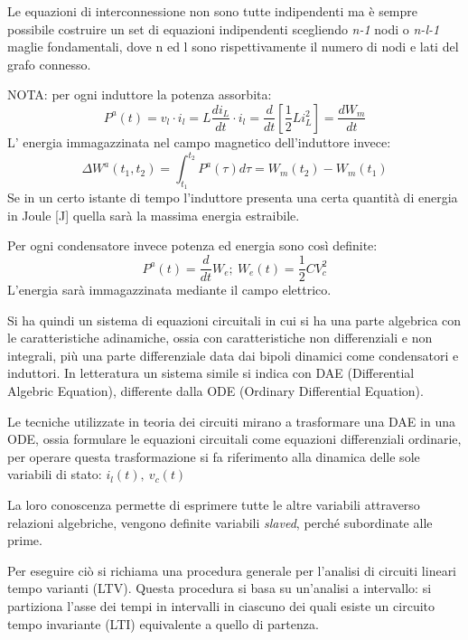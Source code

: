 Le equazioni di interconnessione non sono tutte indipendenti ma è sempre possibile
costruire un set di equazioni indipendenti scegliendo \textit{n-1} nodi o \textit{n-l-1} maglie fondamentali,
dove n ed l sono rispettivamente il numero di nodi e lati del grafo connesso.

NOTA: per ogni induttore la potenza assorbita:
$$ P^a(t) = v_l\cdot i_l = L \frac{di_L}{dt}\cdot i_l = \frac{d}{dt} \left[\frac{1}{2}Li_L^2\right] = \frac{dW_m}{dt} $$ 
L' energia immagazzinata nel campo magnetico dell'induttore invece:
$$\Delta W^a(t_1,t_2) = \int_{t_1}^{t_2} P^a(\tau)d\tau = W_m (t_2) - W_m(t_1) $$
Se in un certo istante di tempo l'induttore presenta una certa quantità di energia in Joule [\si{\joule}] quella sarà la massima energia estraibile.

Per ogni condensatore invece potenza ed energia sono così definite:
$$P^a(t) = \frac{d}{dt} W_e;\ W_e(t) = \frac{1}{2} CV_c^2$$
L'energia sarà immagazzinata mediante il campo elettrico.

Si ha quindi un sistema di equazioni circuitali in cui si ha una parte algebrica con le caratteristiche adinamiche, ossia con caratteristiche
non differenziali e non integrali, più una parte differenziale data dai bipoli dinamici come condensatori e induttori.
In letteratura un sistema simile si indica con DAE (Differential Algebric Equation), differente
dalla ODE (Ordinary Differential Equation).

Le tecniche utilizzate in teoria dei circuiti mirano a trasformare una DAE in una ODE, ossia 
formulare le equazioni circuitali come equazioni differenziali ordinarie, per operare questa trasformazione si fa 
riferimento alla dinamica delle sole {variabili di stato}: $i_l(t),\ v_c(t)$

La loro conoscenza permette di esprimere tutte le altre variabili attraverso relazioni algebriche, vengono definite
variabili \textit{slaved}, perché subordinate alle prime.

Per eseguire ciò si richiama una procedura generale per l'analisi di circuiti lineari tempo varianti (LTV).
Questa procedura si basa su un'analisi a intervallo: si partiziona l'asse dei tempi in intervalli in ciascuno dei 
quali esiste un circuito tempo invariante (LTI) equivalente a quello di partenza.

